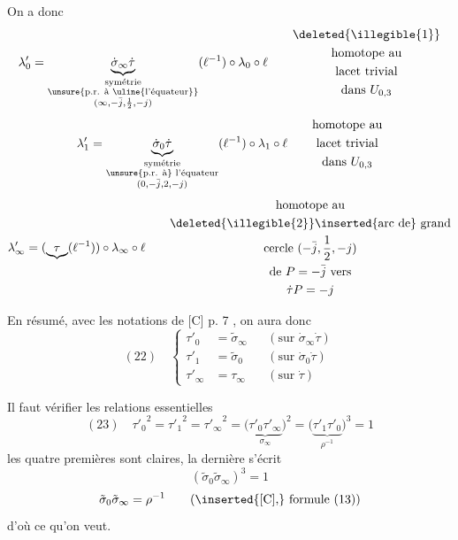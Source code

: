 On a donc
\[
\lambda'_0=
\underbrace{\dot\sigma_\infty\dot\tau}_{\substack{\text{symétrie}\\\text{\unsure{p.r. à \uline{l'équateur}}}\\(\infty,-\bar j,\frac12,-j)}}
(\ell^{-1})\circ\lambda_0\circ\ell
\qquad
\begin{gathered}
\deleted{\illegible{1}}\\
\text{homotope au}\\
\text{lacet trivial}\\
\text{dans }U_{0,3}
\end{gathered}
\]
\[
\lambda'_1=
\underbrace{\dot\sigma_0\dot\tau}_{\substack{\text{symétrie}\\\text{\unsure{p.r. à} l'équateur}\\(0,-\bar j,2,-j)}}
(\ell^{-1})\circ\lambda_1\circ\ell
\qquad
\begin{gathered}
\text{homotope au}\\
\text{lacet trivial}\\
\text{dans }U_{0,3}
\end{gathered}
\]
\[
\lambda'_\infty=(\underbrace{\tau}(\ell^{-1}))\circ\lambda_\infty\circ\ell
\qquad
\begin{gathered}
\text{homotope au}\\
\deleted{\illegible{2}}\inserted{\text{arc de}}\text{ grand}\\
\text{cercle }(-\bar j,\frac12,-j)\\
\text{de }P=-\bar j\text{ vers}\\
\dot\tau P=-j
\end{gathered}
\]



En résumé, avec les notations de [C]  p. 7 , on aura donc
\[
(22)\quad
\left\{
\begin{aligned}
\tau'_0&=\tilde\sigma_\infty &&(\text{sur }\dot\sigma_\infty\dot\tau)\\
\tau'_1&=\tilde\sigma_0 &&(\text{sur }\dot\sigma_0\dot\tau)\\
\tau'_\infty&=\tau_\infty &&(\text{sur }\dot\tau)
\end{aligned}
\right.
\]

Il faut vérifier les relations essentielles
\[
(23)\quad
{\tau'_0}^{2}={\tau'_1}^{2}={\tau'_\infty}^{2}
=\bigl(\underbrace{\tau'_0\tau'_\infty}_{\sigma_\infty}\bigr)^2
=\bigl(\underbrace{\tau'_1\tau'_0}_{\rho^{-1}}\bigr)^3=1
\]
les quatre premières sont claires, la dernière s'écrit
\[
(\tilde\sigma_0\tilde\sigma_\infty)^3=1
\]
\[
\tilde\sigma_0\tilde\sigma_\infty=\rho^{-1}\qquad
(\inserted{\text{[C],}}\text{ formule }(13))
\]
d'où ce qu'on veut.


